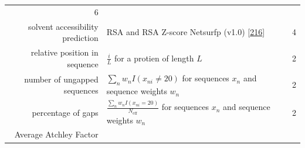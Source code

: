 \documentclass[11pt,a4paper,twoside]{book}
\theoremstyle{definition}
\theoremstyle{definition}
\theoremstyle{remark}
\begin{document}
\begin{longtable}[]{@{}rlc@{}}
\begin{minipage}[t]{0.18\columnwidth}
6\strut
\end{minipage}\tabularnewline
\begin{minipage}[t]{0.23\columnwidth}\raggedleft\strut
solvent accessibility prediction\strut
\end{minipage} & \begin{minipage}[t]{0.50\columnwidth}\raggedright\strut
RSA and RSA Z-score Netsurfp (v1.0)
{[}\protect\hyperlink{ref-Petersen2009a}{216}{]}\strut
\end{minipage} & \begin{minipage}[t]{0.18\columnwidth}\centering\strut
4\strut
\end{minipage}\tabularnewline
\begin{minipage}[t]{0.23\columnwidth}\raggedleft\strut
relative position in sequence\strut
\end{minipage} & \begin{minipage}[t]{0.50\columnwidth}\raggedright\strut
\(\frac{i}{L}\) for a protien of length \(L\)\strut
\end{minipage} & \begin{minipage}[t]{0.18\columnwidth}\centering\strut
2\strut
\end{minipage}\tabularnewline
\begin{minipage}[t]{0.23\columnwidth}\raggedleft\strut
number of ungapped sequences\strut
\end{minipage} & \begin{minipage}[t]{0.50\columnwidth}\raggedright\strut
\(\sum_n w_n I(x_{ni} \neq 20)\) for sequences \(x_n\) and sequence
weights \(w_n\)\strut
\end{minipage} & \begin{minipage}[t]{0.18\columnwidth}\centering\strut
2\strut
\end{minipage}\tabularnewline
\begin{minipage}[t]{0.23\columnwidth}\raggedleft\strut
percentage of gaps\strut
\end{minipage} & \begin{minipage}[t]{0.50\columnwidth}\raggedright\strut
\(\frac{\sum_n w_n I(x_{ni} = 20)}{N_{\text{eff}}}\) for sequences
\(x_n\) and sequence weights \(w_n\)\strut
\end{minipage} & \begin{minipage}[t]{0.18\columnwidth}\centering\strut
2\strut
\end{minipage}\tabularnewline
\begin{minipage}[t]{0.23\columnwidth}\raggedleft\strut
Average Atchley Factor\strut
\end{minipage} & \begin{minipage}[t]{0.50\columnwidth}\raggedright\strut

\end{minipage}
\end{longtable}
\end{document}
